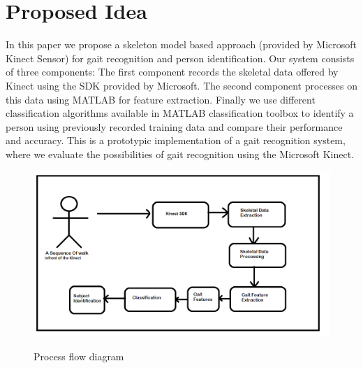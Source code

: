 \section{Proposed Idea} \label{Proposed Idea}
\noindent In this paper we propose a skeleton model based approach (provided by Microsoft Kinect Sensor) for gait recognition and person identification. Our system consists of three components: The first component records the skeletal data offered by Kinect using the SDK provided by Microsoft. The second component processes on this data using MATLAB for feature extraction. Finally we use different classification algorithms available in MATLAB classification toolbox to identify a person using previously recorded training data and compare their performance and accuracy. This is a prototypic implementation of a gait recognition system, where we evaluate the possibilities of gait recognition using the Microsoft Kinect.

\begin{figure}[H]
\centering 
{\includegraphics[scale=0.55]{Figprocessflow.png}}
\caption{Process flow diagram}
\end{figure}

